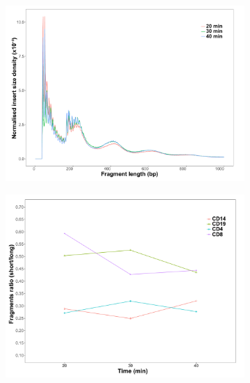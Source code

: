 \begin{figure}[htbp]
\centering
\begin{subfigure}{0.5\textwidth}
\centering
\includegraphics[width=\textwidth]{./Results1/pdfs/ATAC_CD8_fragment_size_distribution_20_30_40min}
\caption{\textbf{}}
\end{subfigure}
\begin{subfigure}{0.5\textwidth}
\centering
\includegraphics[width=\textwidth]{./Results1/pdfs/ATAC_ratio_short_long_fragments_20_30_40_min}
\caption{\textbf{}}
\end{subfigure} \\
\begin{subfigure}{0.5\textwidth}

\end{subfigure}
\end{figure}
